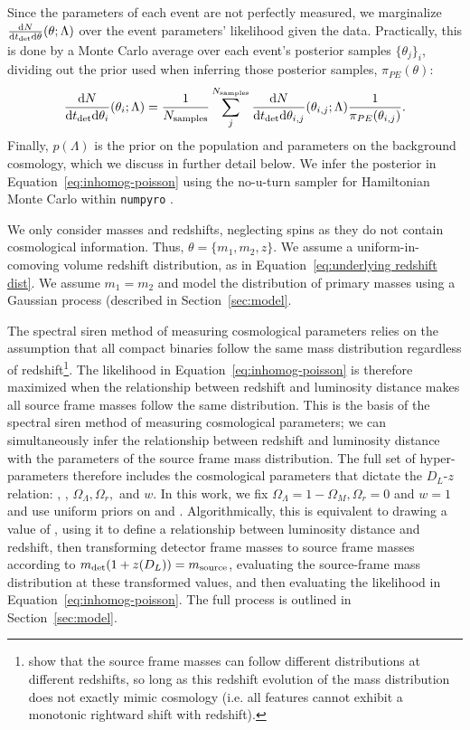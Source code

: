 \documentclass[]{aastex631}
\begin{document}
Since the parameters of each event are not perfectly measured, we marginalize $\frac{\text{d} N}{\text{d} t_{\det} \text{d} \theta} (\theta;\Lambda)$ over the event parameters' likelihood given the data.
Practically, this is done by a Monte Carlo average over each event's posterior samples $\{\theta_j\}_i$, dividing out the prior used when inferring those posterior samples, $\pi_{PE}(\theta)$:
\begin{equation}
    \frac{\diff N}{\diff t_{\det} \diff \theta_i} (\theta_i;\Lambda) = \frac{1}{N_{\text{samples}}}\sum_j^{N_{\text{samples}}} \frac{\diff N}{\diff t_{\det} \diff \theta_{i,j}} (\theta_{i,j};\Lambda) \frac{1}{\pi_{PE}(\theta_{i,j})} .
    \label{eq:single-event-likelihood}
\end{equation}
Finally, $p(\Lambda)$ is the prior on the population and parameters on the background cosmology, which we discuss in further detail below.
We infer the posterior in Equation~\ref{eq:inhomog-poisson} using the no-u-turn sampler for Hamiltonian Monte Carlo within \texttt{numpyro} \citep{hoffman_no-u-turn_2011, numpyro}. 

We only consider masses and redshifts, neglecting spins as they do not contain cosmological information.
Thus, $\theta = \{m_1,m_2,z\}$.
We assume a uniform-in-comoving volume redshift distribution, as in Equation~\ref{eq:underlying redshift dist}.
We assume $m_1=m_2$ and model the distribution of primary masses using a Gaussian process (described in Section~\ref{sec:model}.

The spectral siren method of measuring cosmological parameters relies on the assumption that all compact binaries follow the same mass distribution regardless of redshift\footnote{\citet{ezquiaga_spectral_2022} show that the source frame masses can follow different distributions at different redshifts, so long as this redshift evolution of the mass distribution does not exactly mimic cosmology (i.e. all features cannot exhibit a monotonic rightward shift with redshift).}.
The likelihood in Equation~\ref{eq:inhomog-poisson} is therefore maximized when the relationship between redshift and luminosity distance makes all source frame masses follow the same distribution.
This is the basis of the spectral siren method of measuring cosmological parameters; we can simultaneously infer the relationship between redshift and luminosity distance with the parameters of the source frame mass distribution.
The full set of hyper-parameters therefore includes the cosmological parameters that dictate the $D_L$-$z$ relation: \Ho, \Omm, $\Omega_\Lambda, \Omega_r,$ and $w$.
In this work, we fix $\Omega_\Lambda=1-\Omega_M, \Omega_r=0$ and $w=1$ and use uniform priors on \Ho{} and \Omm{}.
Algorithmically, this is equivalent to drawing a value of \Ho, using it to define a relationship between luminosity distance and redshift, then transforming detector frame masses to source frame masses according to $m_{\det} (1+z(D_L)) = m_{\text{source}}$, evaluating the source-frame mass distribution at these transformed values, and then evaluating the likelihood in Equation~\ref{eq:inhomog-poisson}.
The full process is outlined in Section~\ref{sec:model}.
\end{document}
